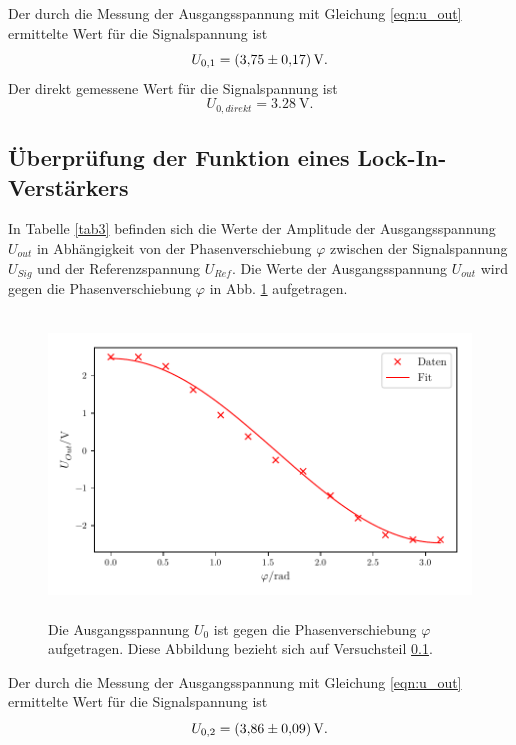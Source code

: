 \noindent Der durch die Messung der Ausgangsspannung mit Gleichung \eqref{eqn:u_out} ermittelte Wert für die Signalspannung ist
\begin{equation*}
    U_{0,1} = \SI{3.75 \pm 0.17}{\volt}.
\end{equation*}
Der direkt gemessene Wert für die Signalspannung ist
\begin{equation*}
    U_{0,direkt} = \SI{3.28}{\volt}. %
\end{equation*}

\subsection{Überprüfung der Funktion eines Lock-In-Verstärkers}
\label{sec:teil2}
In Tabelle \ref{tab3} befinden sich die Werte der Amplitude der Ausgangsspannung $U_{out}$ in
Abhängigkeit von der Phasenverschiebung $\varphi$ zwischen der Signalspannung $U_{Sig}$ und
der Referenzspannung $U_{Ref}$. Die Werte der Ausgangsspannung $U_{out}$ wird gegen die Phasenverschiebung $\varphi$
in Abb. \ref{fig:plot3} aufgetragen.


\begin{figure}
    \centering
    \includegraphics[width=12cm, height=8cm]{build/plot3.pdf}
    \caption{Die Ausgangsspannung $U_{0}$ ist gegen die Phasenverschiebung $\varphi$ aufgetragen.
    Diese Abbildung bezieht sich auf Versuchsteil \ref{sec:teil2}.}
    \label{fig:plot3}
\end{figure}

\noindent Der durch die Messung der Ausgangsspannung mit Gleichung \eqref{eqn:u_out} ermittelte Wert für die Signalspannung ist
\begin{equation*}
    U_{0,2} = \SI{3.86 \pm 0.09}{\volt}.
\end{equation*}

